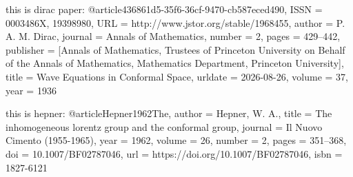 this is dirac paper:
@article{436861d5-35f6-36cf-9470-cb587eced490,
 ISSN = {0003486X, 19398980},
 URL = {http://www.jstor.org/stable/1968455},
 author = {P. A. M. Dirac},
 journal = {Annals of Mathematics},
 number = {2},
 pages = {429--442},
 publisher = {[Annals of Mathematics, Trustees of Princeton University on Behalf of the Annals of Mathematics, Mathematics Department, Princeton University]},
 title = {Wave Equations in Conformal Space},
 urldate = {2026-08-26},
 volume = {37},
 year = {1936}
}

this is hepner:
@article{Hepner1962The,
  author = {Hepner, W. A.},
  title = {The inhomogeneous lorentz group and the conformal group},
  journal = {Il Nuovo Cimento (1955-1965)},
  year = {1962},
  volume = {26},
  number = {2},
  pages = {351--368},
  doi = {10.1007/BF02787046},
  url = {https://doi.org/10.1007/BF02787046},
  isbn = {1827-6121}
}

